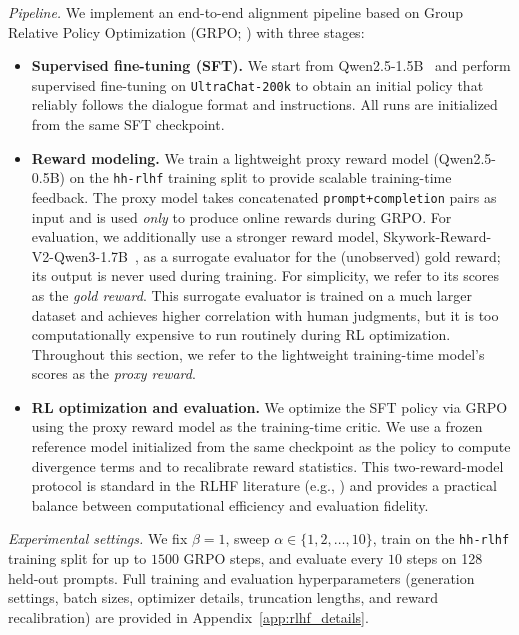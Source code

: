 \documentclass[11pt]{article}
\renewcommand{\paragraph}[1]{\noindent\textit{#1}}
\begin{document}
\paragraph{Pipeline.}
We implement an end-to-end alignment pipeline based on Group Relative Policy
Optimization (GRPO; \citealt{shao2024deepseekmath}) with three stages:
\begin{itemize}
\item[(i)] \textbf{Supervised fine-tuning (SFT).}
We start from Qwen2.5-1.5B~\citep{qwen2.5} and perform supervised fine-tuning on \texttt{UltraChat-200k} to obtain an initial policy
that reliably follows the dialogue format and instructions. All runs are initialized from the same SFT checkpoint.

\item[(ii)] \textbf{Reward modeling.}
We train a lightweight proxy reward model (Qwen2.5-0.5B) on the
\texttt{hh-rlhf} training split to provide scalable training-time feedback.
The proxy model takes concatenated \texttt{prompt+completion} pairs as input
and is used \emph{only} to produce online rewards during GRPO. For
evaluation, we additionally use a stronger reward model,
Skywork-Reward-V2-Qwen3-1.7B~\citep{liu2025skywork}, as a surrogate evaluator
for the (unobserved) gold reward; its output is never used during training. For simplicity, we refer to its scores as the \emph{gold reward}. This surrogate evaluator is trained on a much larger dataset and achieves higher
correlation with human judgments, but it is too computationally expensive to
run routinely during RL optimization. Throughout this section, we refer to the lightweight
training-time model's scores as the \emph{proxy reward}.




\item[(iii)] \textbf{RL optimization and evaluation.}
We optimize the SFT policy via GRPO using the proxy reward model as the training-time critic.
We use a frozen reference model initialized from the same checkpoint as the policy to compute divergence terms and to
recalibrate reward statistics. This two-reward-model protocol is standard in the RLHF literature
(e.g., \citealt{kwa2024catastrophic}) and provides a practical balance between computational efficiency and evaluation fidelity.
\end{itemize}





\paragraph{Experimental settings.}
We fix $\beta=1$, sweep $\alpha\in\{1,2,\ldots,10\}$, train on the \texttt{hh-rlhf} training split for up to $1500$ GRPO steps, and evaluate every $10$ steps on 128 held-out prompts. Full training and evaluation hyperparameters (generation settings, batch sizes, optimizer details, truncation lengths, and reward recalibration) are provided in Appendix~\ref{app:rlhf_details}.\\
\end{document}
